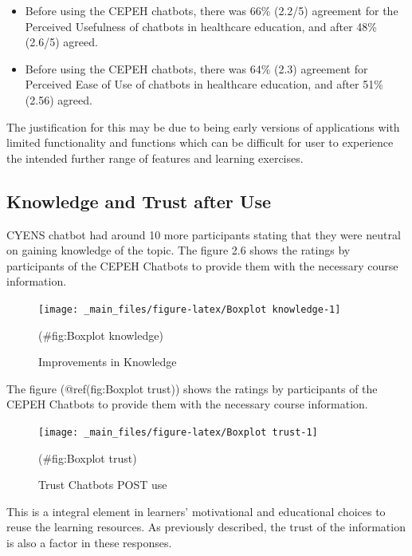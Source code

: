 \documentclass[a4paper, nobind]{templates/ociamthesis}
\begin{document}
\begin{itemize}
\item
  Before using the CEPEH chatbots, there was 66\% (2.2/5) agreement for the Perceived Usefulness of chatbots in healthcare education, and after 48\% (2.6/5) agreed.
\item
  Before using the CEPEH chatbots, there was 64\% (2.3) agreement for Perceived Ease of Use of chatbots in healthcare education, and after 51\% (2.56) agreed.
\end{itemize}

The justification for this may be due to being early versions of applications with limited functionality and functions which can be difficult for user to experience the intended further range of features and learning exercises.

\hypertarget{knowledge-and-trust-after-use}{%
\subsection{Knowledge and Trust after Use}\label{knowledge-and-trust-after-use}}

CYENS chatbot had around 10 more participants stating that they were neutral on gaining knowledge of the topic. The ﬁgure 2.6 shows the ratings by participants of the CEPEH Chatbots to provide them with the necessary course information.

\begin{figure}

{\centering \texttt{[image: \_main\_files/figure-latex/Boxplot knowledge-1]} 

}

\caption{Improvements in Knowledge}(\#fig:Boxplot knowledge)
\end{figure}

The figure (@ref(fig:Boxplot trust)) shows the ratings by participants of the CEPEH Chatbots to provide them with the necessary course information.

\begin{figure}

{\centering \texttt{[image: \_main\_files/figure-latex/Boxplot trust-1]} 

}

\caption{Trust Chatbots POST use}(\#fig:Boxplot trust)
\end{figure}

This is a integral element in learners' motivational and educational choices to reuse the learning resources. As previously described, the trust of the information is also a factor in these responses.
\end{document}
